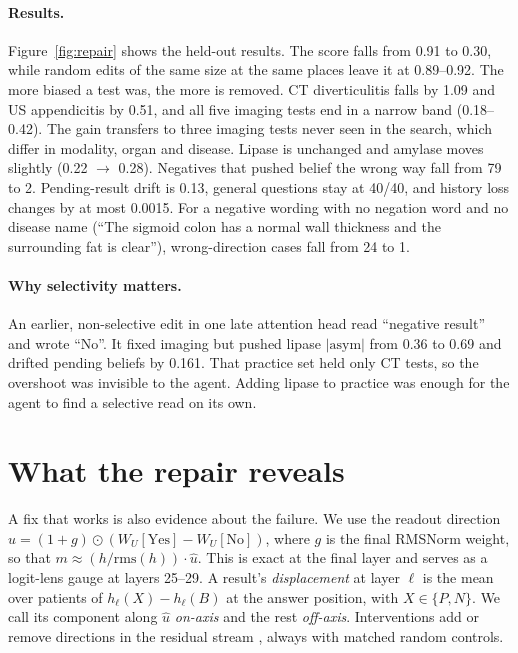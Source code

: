 \documentclass[10pt]{article}
\newcommand{\uhat}{\hat{u}}
\newcommand{\asym}{\mathrm{asym}}
\begin{document}
\paragraph{Results.} Figure~\ref{fig:repair} shows the held-out results. The score falls from 0.91 to 0.30, while random edits of the same size at the same places leave it at 0.89--0.92. The more biased a test was, the more is removed. CT diverticulitis falls by 1.09 and US appendicitis by 0.51, and all five imaging tests end in a narrow band (0.18--0.42). The gain transfers to three imaging tests never seen in the search, which differ in modality, organ and disease. Lipase is unchanged and amylase moves slightly (0.22 $\to$ 0.28). Negatives that pushed belief the wrong way fall from 79 to 2. Pending-result drift is 0.13, general questions stay at 40/40, and history loss changes by at most 0.0015. For a negative wording with no negation word and no disease name (``The sigmoid colon has a normal wall thickness and the surrounding fat is clear''), wrong-direction cases fall from 24 to 1.

\paragraph{Why selectivity matters.} An earlier, non-selective edit in one late attention head read ``negative result'' and wrote ``No''. It fixed imaging but pushed lipase $|\asym|$ from 0.36 to 0.69 and drifted pending beliefs by 0.161. That practice set held only CT tests, so the overshoot was invisible to the agent. Adding lipase to practice was enough for the agent to find a selective read on its own.

\section{What the repair reveals}\label{sec:mech}

A fix that works is also evidence about the failure. We use the readout direction $\uhat = (1+g)\odot(W_U[\text{Yes}] - W_U[\text{No}])$, where $g$ is the final RMSNorm weight, so that $m \approx (h/\mathrm{rms}(h))\cdot\uhat$. This is exact at the final layer and serves as a logit-lens gauge \citep{nostalgebraist2020logitlens} at layers 25--29. A result's \emph{displacement} at layer $\ell$ is the mean over patients of $h_\ell(X) - h_\ell(B)$ at the answer position, with $X \in \{P, N\}$. We call its component along $\uhat$ \emph{on-axis} and the rest \emph{off-axis}. Interventions add or remove directions in the residual stream \citep{turner2023actadd,zhang2024patching}, always with matched random controls.
\end{document}
